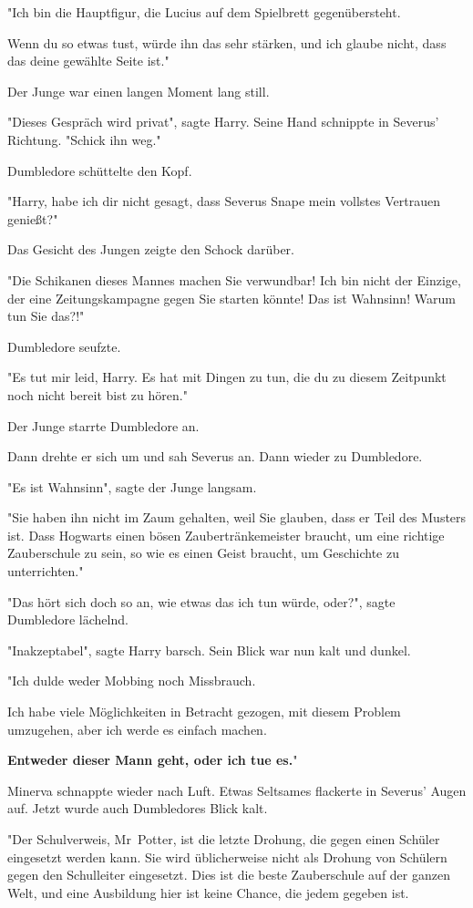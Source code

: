 {"Ich bin die Hauptfigur, die Lucius auf dem Spielbrett gegenübersteht.

Wenn du so etwas tust, würde ihn das sehr stärken, und ich glaube nicht, dass das deine gewählte Seite ist."

Der Junge war einen langen Moment lang still.

"Dieses Gespräch wird privat", sagte Harry. Seine Hand schnippte in Severus' Richtung. "Schick ihn weg."

Dumbledore schüttelte den Kopf.

"Harry, habe ich dir nicht gesagt, dass Severus Snape mein vollstes Vertrauen genießt?"

Das Gesicht des Jungen zeigte den Schock darüber.

"Die Schikanen dieses Mannes machen Sie verwundbar! Ich bin nicht der Einzige, der eine Zeitungskampagne gegen Sie starten könnte! Das ist Wahnsinn! Warum tun Sie das?!"

Dumbledore seufzte.

"Es tut mir leid, Harry. Es hat mit Dingen zu tun, die du zu diesem Zeitpunkt noch nicht bereit bist zu hören."

Der Junge starrte Dumbledore an.

Dann drehte er sich um und sah Severus an. Dann wieder zu Dumbledore.

"Es ist Wahnsinn", sagte der Junge langsam.

"Sie haben ihn nicht im Zaum gehalten, weil Sie glauben, dass er Teil des Musters ist. Dass Hogwarts einen bösen Zaubertränkemeister braucht, um eine richtige Zauberschule zu sein, so wie es einen Geist braucht, um Geschichte zu unterrichten."

"Das hört sich doch so an, wie etwas das ich tun würde, oder?", sagte Dumbledore lächelnd.

"Inakzeptabel", sagte Harry barsch. Sein Blick war nun kalt und dunkel.

"Ich dulde weder Mobbing noch Missbrauch.

Ich habe viele Möglichkeiten in Betracht gezogen, mit diesem Problem umzugehen, aber ich werde es einfach machen.

\textbf{Entweder dieser Mann geht, oder ich tue es.}"

Minerva schnappte wieder nach Luft. Etwas Seltsames flackerte in Severus' Augen auf. Jetzt wurde auch Dumbledores Blick kalt.

"Der Schulverweis, Mr~Potter, ist die letzte Drohung, die gegen einen Schüler eingesetzt werden kann. Sie wird üblicherweise nicht als Drohung von Schülern gegen den Schulleiter eingesetzt. Dies ist die beste Zauberschule auf der ganzen Welt, und eine Ausbildung hier ist keine Chance, die jedem gegeben ist.

}
